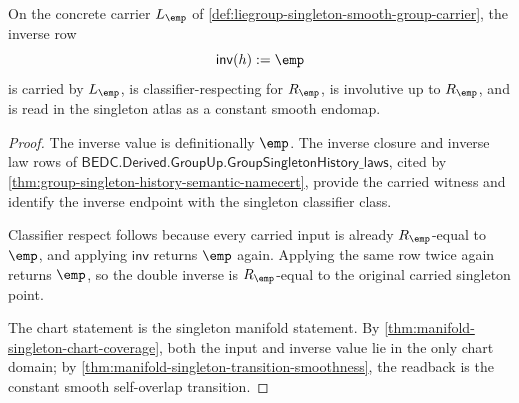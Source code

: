 \begin{theorem}
\label{thm:liegroup-singleton-inverse-smooth-endomap}
On the concrete carrier $L_{\emp}$ of
\autoref{def:liegroup-singleton-smooth-group-carrier}, the inverse row
$$
\mathsf{inv}(h):=\emp
$$
is carried by $L_{\emp}$, is classifier-respecting for $R_{\emp}$, is
involutive up to $R_{\emp}$, and is read in the singleton atlas as a constant
smooth endomap.
\end{theorem}
\begin{proof}
The inverse value is definitionally $\emp$. The inverse closure and inverse law
rows of $\mathsf{BEDC.Derived.GroupUp.GroupSingletonHistory\_laws}$, cited by
\autoref{thm:group-singleton-history-semantic-namecert}, provide the carried
witness and identify the inverse endpoint with the singleton classifier class.

Classifier respect follows because every carried input is already
$R_{\emp}$-equal to $\emp$, and applying $\mathsf{inv}$ returns $\emp$ again.
Applying the same row twice again returns $\emp$, so the double inverse is
$R_{\emp}$-equal to the original carried singleton point.

The chart statement is the singleton manifold statement. By
\autoref{thm:manifold-singleton-chart-coverage}, both the input and inverse
value lie in the only chart domain; by
\autoref{thm:manifold-singleton-transition-smoothness}, the readback is the
constant smooth self-overlap transition.
\end{proof}

